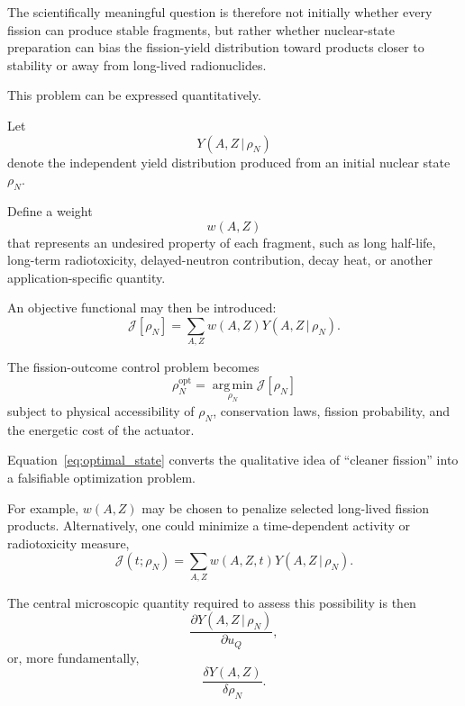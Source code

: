 The scientifically meaningful question is therefore not initially whether every fission can produce stable fragments, but rather whether nuclear-state preparation can bias the fission-yield distribution toward products closer to stability or away from long-lived radionuclides.

This problem can be expressed quantitatively.

Let
\begin{equation}
Y(A,Z\,|\,\rho_N)
\end{equation}
denote the independent yield distribution produced from an initial nuclear state $\rho_N$.

Define a weight
\begin{equation}
w(A,Z)
\end{equation}
that represents an undesired property of each fragment, such as long half-life, long-term radiotoxicity, delayed-neutron contribution, decay heat, or another application-specific quantity.

An objective functional may then be introduced:
\begin{equation}
\mathcal{J}[\rho_N]
=
\sum_{A,Z}
w(A,Z)
Y(A,Z\,|\,\rho_N).
\label{eq:waste_functional}
\end{equation}

The fission-outcome control problem becomes
\begin{equation}
\boxed{
\rho_N^{\mathrm{opt}}
=
\operatorname*{arg\,min}_{\rho_N}
\mathcal{J}[\rho_N]
}
\label{eq:optimal_state}
\end{equation}
subject to physical accessibility of $\rho_N$, conservation laws, fission probability, and the energetic cost of the actuator.

Equation~\eqref{eq:optimal_state} converts the qualitative idea of ``cleaner fission'' into a falsifiable optimization problem.

For example, $w(A,Z)$ may be chosen to penalize selected long-lived fission products. Alternatively, one could minimize a time-dependent activity or radiotoxicity measure,
\begin{equation}
\mathcal{J}(t;\rho_N)
=
\sum_{A,Z}
w(A,Z,t)
Y(A,Z\,|\,\rho_N).
\end{equation}

The central microscopic quantity required to assess this possibility is then
\begin{equation}
\frac{\partial Y(A,Z\,|\,\rho_N)}
{\partial u_Q},
\end{equation}
or, more fundamentally,
\begin{equation}
\frac{\delta Y(A,Z)}
{\delta\rho_N}.
\end{equation}

